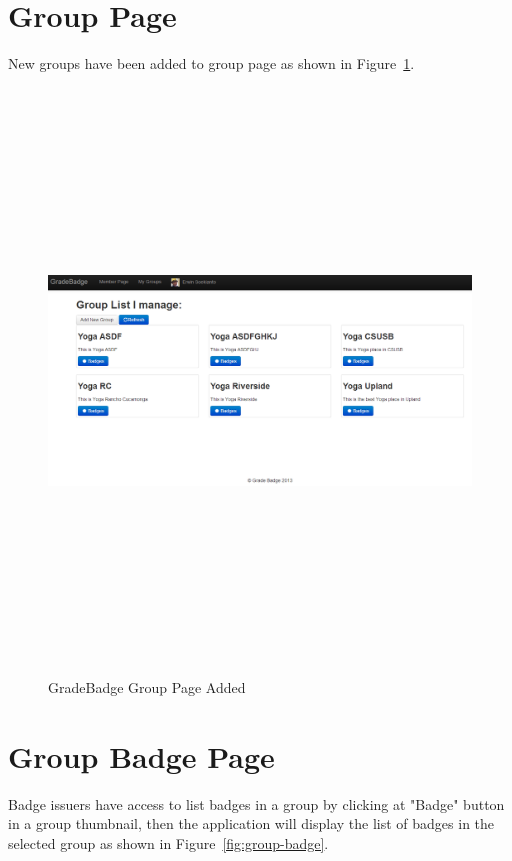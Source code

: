 \newpage
\section{Group Page}
New groups have been added to group page as shown in Figure~\ref{fig:group-page2}. 

\vspace{3em}
\begin{figure}[H]
\begin{center}
\includegraphics[height=6.1in,width=5.5in]{images/group-page2.png}
\caption{GradeBadge Group Page Added}
\label{fig:group-page2}
\end{center}
\end{figure}

\newpage
\section{Group Badge Page}
Badge issuers have access to list badges in a group by clicking at "Badge" button in a group thumbnail, then the application will display the list of badges in the selected group  as shown in Figure~\ref{fig:group-badge}. 

